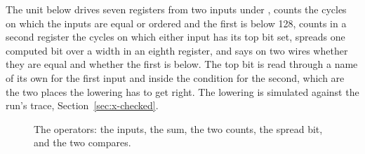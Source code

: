 The unit below drives seven registers from two inputs under
, counts the cycles on which the inputs are equal or ordered
and the first is below 128, counts in a second register the cycles on
which either input has its top bit set, spreads one computed bit over
a width in an eighth register, and says on two wires whether
they are equal and whether the first is below. The top bit is read
through a name of its own for the first input and inside the
condition for the second, which are the two places the lowering has
to get right. The lowering is simulated against the run's
trace, Section~\ref{sec:x-checked}.

\begin{figure}[htbp]
\centering

\caption{The operators: the inputs, the sum, the two counts, the
spread bit, and the two compares.}
\label{fig:x-ops}
\end{figure}




